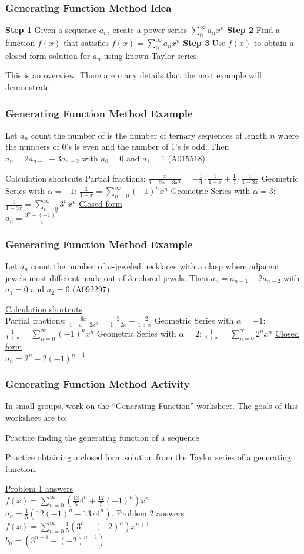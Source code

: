 \documentclass{beamer}
\newenvironment{packed_enum}{
\begin{enumerate}
  \setlength{\itemsep}{1pt}
  \setlength{\parskip}{0pt}
  \setlength{\parsep}{0pt}
}{\end{enumerate}}
\begin{document}
\frame
{
  \frametitle{Generating Function Method Idea}

{\bf Step 1} Given a sequence $a_n$, create a power series $\sum^\infty_0a_nx^n$ \vfill
{\bf Step 2} Find a function $f(x)$ that satisfies $f(x)=\sum^\infty_0 a_n x^n$ \vfill
{\bf Step 3} Use $f(x)$ to obtain a closed form solution for $a_n$ using known Taylor series. \vfill

This is an overview.  There are many details that the next example will demonstrate.

}


\frame
{
  \frametitle{Generating Function Method Example}

Let $a_n$ count the number of is the number of ternary sequences of length $n$ where the numbers of 0's is even and the number of 1's is odd.  Then $a_n=2a_{n-1}+3a_{n-2}$ with $a_0=0$ and $a_1=1$  (A015518). \vfill

Calculation shortcuts
Partial fractions: $\frac{x}{1-2x-3x^2}=-\frac{1}{4}\cdot\frac{1}{1+x}+\frac{1}{4}\cdot\frac{1}{1-3x}$ \vfill
Geometric Series with $\alpha=-1$: $\frac{1}{1+x}=\sum_{n=0}^{\infty}(-1)^nx^n$\vfill
Geometric Series with $\alpha=3$: $\frac{1}{1-3x}=\sum_{n=0}^{\infty}3^nx^n$\vfill
\pause \underline{Closed form}\\$a_n=\frac{3^n - (-1)^n}{4}$

}

\frame
{
  \frametitle{Generating Function Method Example}

Let $a_n$ count the number of $n$-jeweled necklaces with a clasp where adjacent jewels must different made out of 3 colored jewels.  Then $a_n=a_{n-1}+2a_{n-2}$ with $a_1=0$ and $a_2=6$  (A092297). \vfill

\underline{Calculation shortcuts}\\
Partial fractions: $\frac{6x}{1-x-2x^2}=\frac{2}{1-2 x}+\frac{-2}{1+x}$ \vfill
Geometric Series with $\alpha=-1$: $\frac{1}{1+x}=\sum_{n=0}^{\infty}(-1)^nx^n$\vfill
Geometric Series with $\alpha=2$: $\frac{1}{1+x}=\sum_{n=0}^{\infty}2^nx^n$\vfill
\pause \underline{Closed form}\\$a_n=2^n - 2(-1)^{n-1}$

}

\frame
{
  \frametitle{Generating Function Method Activity}

In small groups, work on the ``Generating Function'' worksheet. The goals of this worksheet are to:
\vfill
\begin{packed_enum}
\item Practice finding the generating function of a sequence
\item Practice obtaining a closed form solution from the Taylor series of a generating function.
\end{packed_enum}
\pause
\vfill
\underline{Problem 1 answers}\\$f(x)=\sum_{n=0}^\infty\left( \frac{13}{5}4^n+\frac{12}{5}(-1)^n\right)x^{n} $\\$a_n=\frac{1}{5}\left(12 (-1)^n+13\cdot 4^n\right).$
\pause
\vfill
\underline{Problem 2 answers}\\ $f(x)=\sum_{n=0}^\infty\frac{1}{5}\left( 3^n-(-2)^n\right)x^{n+1}$\\ $b_n=\left(3^{n-1}-(-2)^{n-1}\right)$
}
\end{document}
